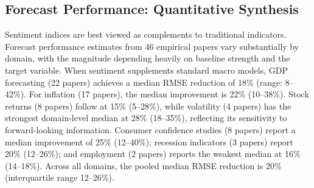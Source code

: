 \documentclass[12pt,oneside]{article}
\begin{document}
\subsection{Forecast Performance: Quantitative Synthesis}

Sentiment indices are best viewed as complements to traditional indicators. Forecast performance estimates from 46 empirical papers vary substantially by domain, with the magnitude depending heavily on baseline strength and the target variable. When sentiment supplements standard macro models, GDP forecasting (22 papers) achieves a median RMSE reduction of 18\% (range: 8--42\%). For inflation (17 papers), the median improvement is 22\% (10--38\%). Stock returns (8 papers) follow at 15\% (5--28\%), while volatility (4 papers) has the strongest domain-level median at 28\% (18--35\%), reflecting its sensitivity to forward-looking information. Consumer confidence studies (8 papers) report a median improvement of 25\% (12--40\%); recession indicators (3 papers) report 20\% (12--26\%); and employment (2 papers) reports the weakest median at 16\% (14--18\%). Across all domains, the pooled median RMSE reduction is 20\% (interquartile range 12--26\%).
\end{document}
